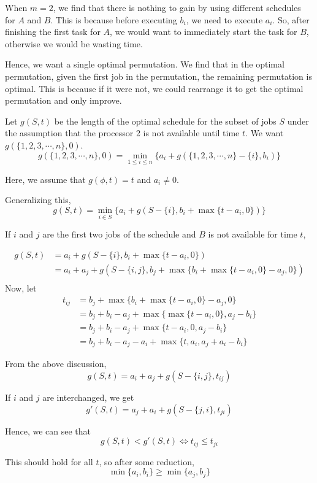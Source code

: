 \documentclass[12pt,letterpaper]{article}
\theoremstyle{definition}
\begin{document}
When $m=2$, we find that there is nothing to gain by using different schedules for $A$ and $B$. This is because before executing $b_i$, we need to execute $a_i$. So, after finishing the first task for $A$, we would want to immediately start the task for $B$, otherwise we would be wasting time.

Hence, we want a single optimal permutation. We find that in the optimal permutation, given the first job in the permutation, the remaining permutation is optimal. This is because if it were not, we could rearrange it to get the optimal permutation and only improve.

Let $g(S,t)$ be the length of the optimal schedule for the subset of jobs $S$ under the assumption that the processor 2 is not available until time $t$. We want $g(\{1,2,3,\cdots, n\},0)$.
\[g(\{1,2,3,\cdots,n\},0) = \min_{1 \leq i \leq n} \{a_i + g(\{1,2,3,\cdots,n\} - \{i\},b_i)\}\]

Here, we assume that $g(\phi,t) = t$ and $a_i \neq 0$.

Generalizing this,
\[g(S,t) = \min_{i \in S} \{a_i + g(S-\{i\},b_i + \max\{t-a_i,0\})\}\]

If $i$ and $j$ are the first two jobs of the schedule and $B$ is not available for time $t$,

\begin{align*}
  g(S,t) &= a_i + g(S- \{i\},b_i + \max \{t-a_i,0\}) \\
         &= a_i + a_j + g(S-\{i,j\},b_j + \max \{b_i + \max\{t-a_i,0\}-a_j,0\}) \\
\end{align*}
Now, let
\begin{align*}
  t_{ij} &= b_j + \max \{b_i + \max \{t-a_i,0\} - a_j,0\} \\
         &= b_j + b_i -a_j + \max \{ \max \{t-a_i,0\}, a_j - b_i \} \\
         &= b_j + b_i - a_j + \max \{t-a_i,0,a_j-b_i\} \\
         &= b_j + b_i - a_j - a_i + \max \{t,a_i,a_j+a_i -b_i\}
\end{align*}

From the above discussion,
\[g(S,t) = a_i + a_j + g(S-\{i,j\},t_{ij})\]

If $i$ and $j$ are interchanged, we get
\[g'(S,t) = a_j + a_i + g(S-\{j,i\},t_{ji})\]

Hence, we can see that
\[g(S,t) < g'(S,t) \Leftrightarrow t_{ij} \leq t_{ji}\]

This should hold for all $t$, so after some reduction,
\[\min\{a_i,b_i\} \geq \min \{a_j,b_j\}\]
\end{document}
